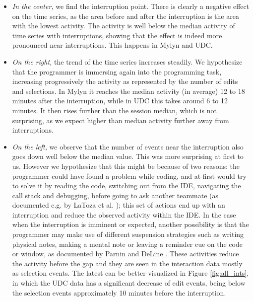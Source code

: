 \documentclass[times]{smrauth}
\begin{document}
\begin{itemize}
\item \textit{In the center,} we find the interruption point. There is clearly a negative effect on the time series, as the area before and after the interruption is the area with the lowest activity. The activity is well below the median activity of time series with interruptions, showing that the effect is indeed more pronounced near interruptions. This happens in Mylyn and UDC.

\item \textit{On the right,} the trend of the time series increases steadily. We hypothesize that the programmer is immersing again into the programming task, increasing progressively the activity as represented by the number of edits and selections. In Mylyn it reaches the median activity (in average) 12 to 18 minutes after the interruption, while in UDC this takes around 6 to 12 minutes. It then rises further than the session median, which is not surprising, as we expect higher than median activity further away from interruptions.

\item \textit{On the left,} we observe that the number of events near the interruption also goes down well below the median value. This was more surprising at first to us. However we hypothesize that this might be because of two reasons: the programmer could have found a problem while coding, and at first would try to solve it by reading the code, switching out from the IDE, navigating the call stack and debugging, before going to ask another teammate (as documented e.g. by LaToza et al. \cite{LVD06}); this set of actions end up with an interruption and reduce the observed activity within the IDE. In the case when the interruption is imminent or expected, another possibility is that the programmer may make use of different suspension strategies such as writing physical notes, making a mental note or leaving a reminder cue on the code or window, as documented by Parnin and DeLine \cite{PD10}. These activities reduce the activity before the gap and they are seen in the interaction data mostly as selection events. The latest can be better visualized in Figure \ref{fig:all_ints}, in which the UDC data has a significant decrease of edit events, being below the selection events approximately 10 minutes before the interruption.


\end{itemize}
\end{document}
